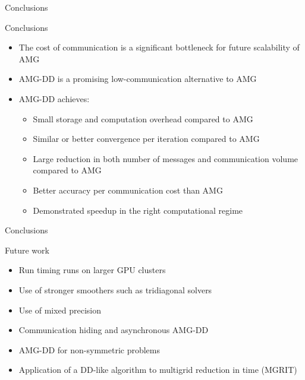 \documentclass[18pt,xcolor=table]{beamer}
\begin{document}
\begin{frame}{Conclusions}
\begin{block}{Conclusions}
\begin{itemize}
\item The cost of communication is a significant bottleneck for future scalability of AMG
\item AMG-DD is a promising low-communication alternative to AMG
\item AMG-DD achieves:
\begin{itemize}
\item Small storage and computation overhead compared to AMG
\item Similar or better convergence per iteration compared to AMG
\item Large reduction in both number of messages and communication volume compared to AMG
\item Better accuracy per communication cost than AMG
\item Demonstrated speedup in the right computational regime
\end{itemize}
\end{itemize}
\end{block}
\end{frame}

\begin{frame}{Conclusions}
\begin{block}{Future work}
\begin{itemize}
\item Run timing runs on larger GPU clusters
\item Use of stronger smoothers such as tridiagonal solvers
\item Use of mixed precision
\item Communication hiding and asynchronous AMG-DD
\item AMG-DD for non-symmetric problems
\item Application of a DD-like algorithm to multigrid reduction in time (MGRIT)
\end{itemize}
\end{block}

\end{frame}


\end{document}
